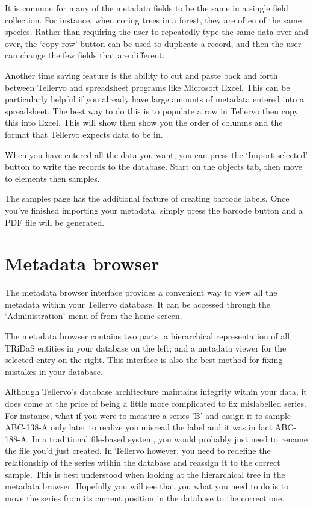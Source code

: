 It is common for many of the metadata fields to be the same in a single field collection.  For instance, when coring trees in a forest, they are often of the same species.  Rather than requiring the user to repeatedly type the same data over and over, the `copy row' button can be used to duplicate a record, and then the user can change the few fields that are different.

Another time saving feature is the ability to cut and paste back and forth between Tellervo and spreadsheet programs like Microsoft Excel.  This can be particularly helpful if you already have large amounts of metadata entered into a spreadsheet.  The best way to do this is to populate a row in Tellervo then copy this into Excel.  This will show then show you the order of columns and the format that Tellervo expects data to be in. 

When you have entered all the data you want, you can press the `Import selected' button to write the records to the database.  Start on the objects tab, then move to elements then samples.  

The samples page has the additional feature of creating barcode labels.  Once you've finished importing your metadata, simply press the barcode button and a PDF file will be generated.

\section{Metadata browser}
The metadata browser interface provides a convenient way to view all the metadata within your Tellervo database.  It can be accessed through the `Administration' menu of from the home screen.

The metadata browser contains two parts: a hierarchical representation of all TRiDaS entities in your database on the left; and a metadata viewer for the selected entry on the right.  This interface is also the best method for fixing mistakes in your database.  

Although Tellervo's database architecture maintains integrity within your data, it does come at the price of being a little more complicated to fix mislabelled series.  For instance, what if you were to measure a series 'B' and assign it to sample ABC-138-A only later to realize you misread the label and it was in fact ABC-188-A.  In a traditional file-based system, you would probably just need to rename the file you'd just created.  In Tellervo however, you need to redefine the relationship of the series within the database and reassign it to the correct sample.  This is best understood when looking at the hierarchical tree in the metadata browser.  Hopefully you will see that you what you need to do is to move the series from its current position in the database to the correct one.  

